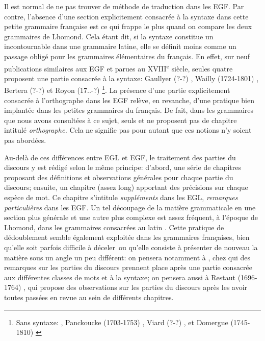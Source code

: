 \documentclass[output=paper]{langsci/langscibook}
\begin{document}
Il est normal de ne pas trouver de méthode de traduction dans les EGF. Par contre, l’absence d’une section explicitement consacrée à la syntaxe dans cette petite grammaire française est ce qui frappe le plus quand on compare les deux grammaires de Lhomond. Cela étant dit, si la syntaxe constitue un incontournable dans une grammaire latine, elle se définit moins comme un passage obligé pour les grammaires élémentaires du français. En effet, sur neuf publications similaires aux EGF et parues au XVIII\textsuperscript{e} siècle, seules quatre proposent une partie consacrée à la syntaxe: Gaullyer (?-?) \citeyear{gaullyer_abrege_1722}, Wailly (1724-1801) \citeyear{wailly_abrege_1759}, Bertera (?-?) \citeyear{bertera_nouvelle_1773} et Royon (17..-?) \citeyear{royon_professeur_traite_1777}\footnote{\textrm{Sans syntaxe: \citet{restaut_abrege_1732}, Panckoucke (1703-1753) \citeyear{panckoucke_les_1749}, Viard (?-?) \citeyear{viard_les_1763}, \citet{chompre_petite_1778} et Domergue (1745-1810) \citeyear{domerque_grammaire_1778}}}. La présence d’une partie explicitement consacrée à l’orthographe dans les EGF relève, en revanche, d’une pratique bien implantée dans les petites grammaires du français. De fait, dans les grammaires que nous avons consultées à ce sujet, seuls \citet{wailly_abrege_1759} et \citet{viard_les_1763} ne proposent pas de chapitre intitulé \textit{orthographe.} Cela ne signifie pas pour autant que ces notions n’y soient pas abordées. 

Au-delà de ces différences entre EGL et EGF, le traitement des parties du discours y est rédigé selon le même principe: d’abord, une série de chapitres proposant des définitions et observations générales pour chaque partie du discours; ensuite, un chapitre (assez long) apportant des précisions sur chaque espèce de mot. Ce chapitre s’intitule \textit{suppléments} dans les EGL, \textit{remarques} \textit{particulières} dans les EGF. Un tel découpage de la matière grammaticale en une section plus générale et une autre plus complexe est assez fréquent, à l’époque de Lhomond, dans les grammaires consacrées au latin \citep{colombat_grammaire_1999}. Cette pratique de dédoublement semble également exploitée dans les grammaires françaises, bien qu’elle soit parfois difficile à déceler~ou qu’elle consiste à présenter de nouveau la matière sous un angle un peu différent: on pensera notamment à \citet{wailly_abrege_1759}, chez qui des remarques sur les parties du discours prennent place après une partie consacrée aux différentes classes de mots et à la syntaxe; on pensera aussi à Restaut (1696-1764) \citeyear{restaut_abrege_1732}, qui propose des observations sur les parties du discours après les avoir toutes passées en revue au sein de différents chapitres.
\end{document}
